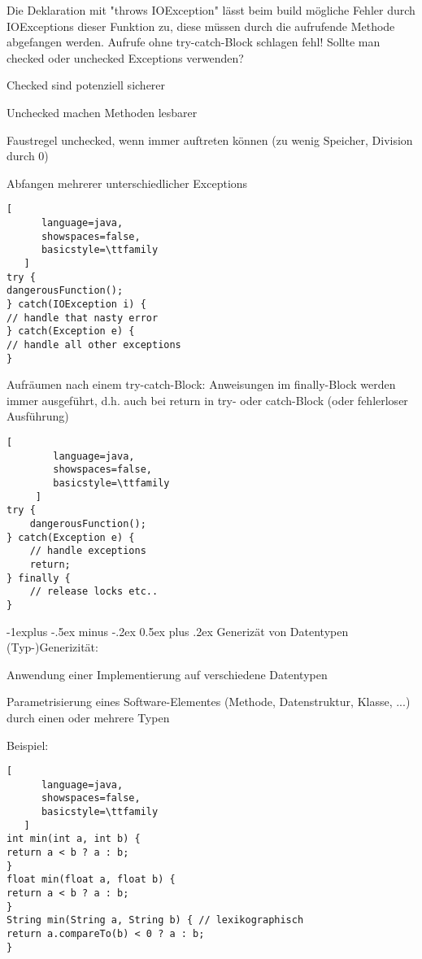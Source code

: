 \documentclass[10pt]{article}
\makeatletter
\renewcommand{\subsection}{\@startsection{subsection}{2}{0mm}%
                                {-1explus -.5ex minus -.2ex}%
                                {0.5ex plus .2ex}%
                                {\normalfont\normalsize\bfseries}}
\makeatother
\begin{document}
Die Deklaration mit "throws IOException" lässt beim build mögliche Fehler durch IOExceptions dieser Funktion zu, diese müssen durch die aufrufende Methode abgefangen werden.
Aufrufe ohne try-catch-Block schlagen fehl!
Sollte man checked oder unchecked Exceptions verwenden?
\begin{itemize*}
  \item Checked sind potenziell sicherer
  \item Unchecked machen Methoden lesbarer
  \item Faustregel unchecked, wenn immer auftreten können (zu wenig Speicher, Division durch 0)
\end{itemize*}

Abfangen mehrerer unterschiedlicher Exceptions
\begin{lstlisting}[
      language=java,
      showspaces=false,
      basicstyle=\ttfamily
   ]
try {
dangerousFunction();
} catch(IOException i) {
// handle that nasty error
} catch(Exception e) {
// handle all other exceptions
}
\end{lstlisting}

Aufräumen nach einem try-catch-Block: Anweisungen im finally-Block werden immer ausgeführt, d.h. auch bei
return in try- oder catch-Block (oder fehlerloser Ausführung)
\begin{lstlisting}[
        language=java,
        showspaces=false,
        basicstyle=\ttfamily
     ]
try {
    dangerousFunction();
} catch(Exception e) {
    // handle exceptions
    return;
} finally {
    // release locks etc..
}
\end{lstlisting}

\subsection{Generizät von Datentypen}
(Typ-)Generizität:
\begin{itemize*}
  \item Anwendung einer Implementierung auf verschiedene Datentypen
  \item Parametrisierung eines Software-Elementes (Methode, Datenstruktur, Klasse, ...) durch einen oder mehrere Typen
\end{itemize*}
Beispiel:
\begin{lstlisting}[
      language=java,
      showspaces=false,
      basicstyle=\ttfamily
   ]
int min(int a, int b) {
return a < b ? a : b;
}
float min(float a, float b) {
return a < b ? a : b;
}
String min(String a, String b) { // lexikographisch
return a.compareTo(b) < 0 ? a : b;
}
\end{lstlisting}
\end{document}
